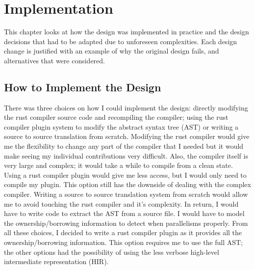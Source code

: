 \chapter{Implementation}
\label{chapter:Implementation}

This chapter looks at how the design was implemented in practice and the design decisions that had to be adapted due to unforeseen complexities. Each design change is justified with an example of why the original design fails, and alternatives that were considered.

\section{How to Implement the Design}
There was three choices on how I could implement the design: directly modifying the rust compiler source code and recompiling the compiler; using the rust compiler plugin system to modify the abstract syntax tree (AST) or writing a source to source translation from scratch. Modifying the rust compiler would give me the flexibility to change any part of the compiler that I needed but it would make seeing my individual contributions very difficult. Also, the compiler itself is very large and complex; it would take a while to compile from a clean state. Using a rust compiler plugin would give me less access, but I would only need to compile my plugin. This option still has the downside of dealing with the complex compiler. Writing a source to source translation system from scratch would allow me to avoid touching the rust compiler and it's complexity. In return, I would have to write code to extract the AST from a source file. I would have to model the ownership/borrowing information to detect when parallelisms properly. From all these choices, I decided to write a rust compiler plugin as it provides all the ownership/borrowing information. This option requires me to use the full AST; the other options had the possibility of using the less verbose high-level intermediate representation (HIR).

